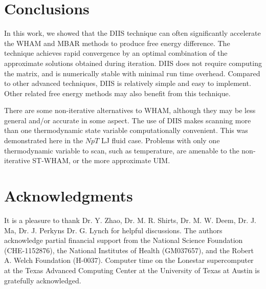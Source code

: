 \documentclass[aip,jcp,preprint,superscriptaddress]{revtex4-1}
\begin{document}
\section{Conclusions}



In this work, we showed that the DIIS technique
can often significantly accelerate
the WHAM and MBAR methods to produce free energy difference.
%
The technique achieves rapid convergence
by an optimal combination of the approximate
solutions obtained during iteration.
%
DIIS does not require computing
the  matrix,
and is numerically stable
with minimal run time overhead.
%
Compared to other advanced techniques\cite{
shirts2008, zhu2012},
DIIS is relatively simple and easy to implement.
%
Other related free energy methods\cite{
shen1991, woolf1994, *crouzy1994, roux1995}
may also benefit from this technique.
%



There are some non-iterative alternatives to WHAM,
although they may be less general and/or accurate
in some aspect.
%
The use of DIIS makes scanning more than one thermodynamic state variable
computationally convenient.
%
This was demonstrated here in the $NpT$ LJ fluid case.
%
Problems with only one thermodynamic variable to scan, such as temperature,
are amenable to the non-iterative ST-WHAM,
or the more approximate UIM.
%




\section{Acknowledgments}





It is a pleasure to thank
Dr. Y. Zhao,
Dr. M. R. Shirts,
Dr. M. W. Deem,
Dr. J. Ma,
Dr. J. Perkyns Dr. G. Lynch
for helpful discussions.
%
The authors acknowledge
partial financial support from
the National Science Foundation (CHE-1152876),
the National Institutes of Health (GM037657),
and
the Robert A. Welch Foundation (H-0037).
%
Computer time on the Lonestar supercomputer
at the Texas Advanced Computing Center
at the University of Texas at Austin
is gratefully acknowledged.
\end{document}
